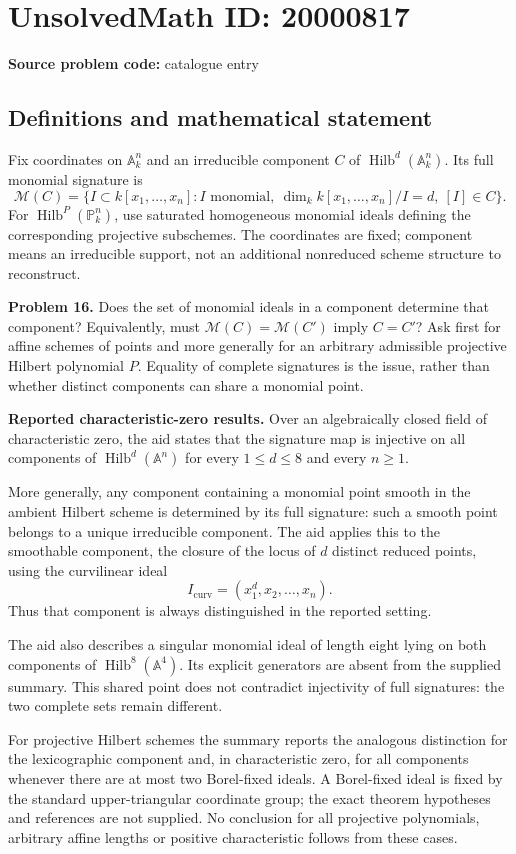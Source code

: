 \documentclass[11pt]{article}
\newcommand{\A}{\mathbb{A}}
\newcommand{\PP}{\mathbb{P}}
\begin{document}
\section*{UnsolvedMath ID: 20000817}
\textbf{Source problem code:} catalogue entry
\subsection{Definitions and mathematical statement}
Fix coordinates on $\A_k^n$ and an irreducible component $C$ of $\operatorname{Hilb}^d(\A_k^n)$. Its full monomial signature is
\[
 \mathcal M(C)=\{I\subset k[x_1,\ldots,x_n]:I\text{ monomial},\ \dim_k k[x_1,\ldots,x_n]/I=d,\ [I]\in C\}.
\]
For $\operatorname{Hilb}^P(\PP_k^n)$, use saturated homogeneous monomial ideals defining the corresponding projective subschemes. The coordinates are fixed; component means an irreducible support, not an additional nonreduced scheme structure to reconstruct.

\textbf{Problem 16.} Does the set of monomial ideals in a component determine that component? Equivalently, must $\mathcal M(C)=\mathcal M(C')$ imply $C=C'$? Ask first for affine schemes of points and more generally for an arbitrary admissible projective Hilbert polynomial $P$. Equality of complete signatures is the issue, rather than whether distinct components can share a monomial point.

\textbf{Reported characteristic-zero results.} Over an algebraically closed field of characteristic zero, the aid states that the signature map is injective on all components of $\operatorname{Hilb}^d(\A^n)$ for every $1\leq d\leq8$ and every $n\geq1$.

More generally, any component containing a monomial point smooth in the ambient Hilbert scheme is determined by its full signature: such a smooth point belongs to a unique irreducible component. The aid applies this to the smoothable component, the closure of the locus of $d$ distinct reduced points, using the curvilinear ideal
\[
 I_{\mathrm{curv}}=(x_1^d,x_2,\ldots,x_n).
\]
Thus that component is always distinguished in the reported setting.

The aid also describes a singular monomial ideal of length eight lying on both components of $\operatorname{Hilb}^8(\A^4)$. Its explicit generators are absent from the supplied summary. This shared point does not contradict injectivity of full signatures: the two complete sets remain different.

For projective Hilbert schemes the summary reports the analogous distinction for the lexicographic component and, in characteristic zero, for all components whenever there are at most two Borel-fixed ideals. A Borel-fixed ideal is fixed by the standard upper-triangular coordinate group; the exact theorem hypotheses and references are not supplied. No conclusion for all projective polynomials, arbitrary affine lengths or positive characteristic follows from these cases.
\end{document}
